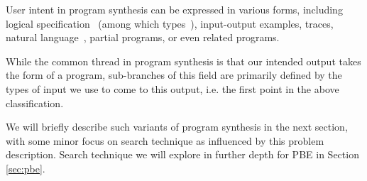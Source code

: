 \documentclass{article} %
\begin{document}
User intent in program synthesis can be expressed in various forms, including logical specification~\citep{temporalstreamlogic} (among which types~\citep{synquid}),
input-output examples, traces, natural language~\citep{abstractsyntaxnetworks},
partial programs, or even related programs.~\citep{gulwani2017program}

While the common thread in program synthesis is that our intended output takes the form of a program,
sub-branches of this field are primarily defined by the types of input we use to come to this output,
i.e. the 
first point
in the above classification.

We will briefly describe such variants of program synthesis in the next section,
with some minor focus on search technique as influenced by this problem description.
Search technique we will explore in further depth for PBE in Section \ref{sec:pbe}.




\end{document}
